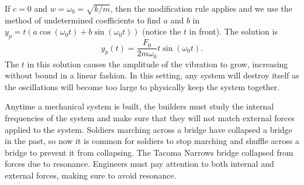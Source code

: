 \begin{observation}
If $c=0$ and $w=\omega_0 = \sqrt{k/m}$, then the modification rule applies and we use the method of undetermined coefficients to find $a$ and $b$ in $y_p=t(a\cos(\omega_0 t)+b\sin(\omega_0 t))$ (notice the $t$ in front). The solution is 
$$y_p(t) = \frac{F_0}{2m\omega_0}t\sin(\omega_0 t).$$ The $t$ in this solution causes the amplitude of the vibration to grow,  increasing without bound in a linear fashion. In this setting, any system will destroy itself as the oscillations will become too large to physically keep the system together. 

Anytime a mechanical system is built, the builders must study the internal frequencies of the system and make sure that they will not match external forces applied to the system. Soldiers marching across a bridge have collapsed a bridge in the past, so now it is common for soldiers to stop marching and shuffle across a bridge to prevent it from collapsing. The Tacoma Narrows bridge collapsed from forces due to resonance. Engineers must pay attention to both internal and external forces, making sure to avoid resonance.  
\end{observation}


